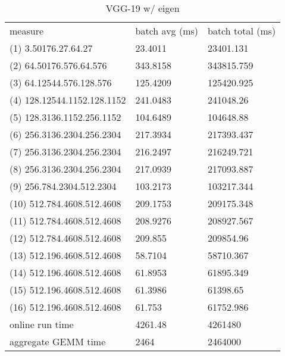 \begin{longtable}{lll}
\caption{VGG-19 w/ eigen}\\
measure                     & batch avg (ms) & batch total (ms) \\
(1) 3.50176.27.64.27        & 23.4011        & 23401.131        \\
(2) 64.50176.576.64.576     & 343.8158       & 343815.759       \\
(3) 64.12544.576.128.576    & 125.4209       & 125420.925       \\
(4) 128.12544.1152.128.1152 & 241.0483       & 241048.26        \\
(5) 128.3136.1152.256.1152  & 104.6489       & 104648.88        \\
(6) 256.3136.2304.256.2304  & 217.3934       & 217393.437       \\
(7) 256.3136.2304.256.2304  & 216.2497       & 216249.721       \\
(8) 256.3136.2304.256.2304  & 217.0939       & 217093.887       \\
(9) 256.784.2304.512.2304   & 103.2173       & 103217.344       \\
(10) 512.784.4608.512.4608  & 209.1753       & 209175.348       \\
(11) 512.784.4608.512.4608  & 208.9276       & 208927.567       \\
(12) 512.784.4608.512.4608  & 209.855        & 209854.96        \\
(13) 512.196.4608.512.4608  & 58.7104        & 58710.367        \\
(14) 512.196.4608.512.4608  & 61.8953        & 61895.349        \\
(15) 512.196.4608.512.4608  & 61.3986        & 61398.65         \\
(16) 512.196.4608.512.4608  & 61.753         & 61752.986        \\
online run time             & 4261.48        & 4261480          \\
aggregate GEMM time         & 2464           & 2464000         
\end{longtable}

